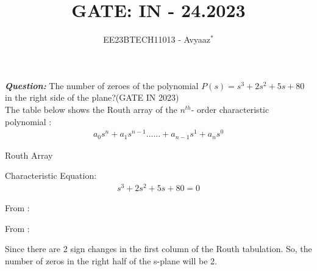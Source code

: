 \documentclass[journal,12pt,twocolumn]{IEEEtran}
\theoremstyle{remark}
\begin{document}

\vspace{3cm}

\title{GATE: IN - 24.2023}
\author{EE23BTECH11013 - Avyaaz$^{*}$%
}
\maketitle
\newpage
\bigskip

\renewcommand{\thefigure}{\arabic{figure}}
\renewcommand{\thetable}{\arabic{table}}

\large\textbf{\textsl{Question:}}
The number of zeroes of the polynomial $P(s) = s^3+2s^2+5s+80$ in the right side of the plane?\hfill(GATE IN 2023) \\
\solution
\fi
The table below shows the Routh array of the $n^{th}$- order characteristic polynomial : 
\begin{align}
    a_0s^n+a_1s^{n-1}......+a_{n-1}s^1+a_ns^0
\end{align}

\begin{table}[htbp]
\setlength{\extrarowheight}{8pt}
\centering

\caption{Routh Array}
\label{tab:routharray.IN.24.2023}
\end{table}
 Characteristic Equation:
\begin{align}
   s^3+2s^2+5s+80 = 0  
\end{align}


\noindent From :

\begin{table}[htbp]
\setlength{\extrarowheight}{10pt}
\centering

\caption{}
\label{tab:inputs.IN.24.2023}
\end{table}


\noindent From :

Since there are 2 sign changes in the first column of the Routh tabulation. So, the number of zeros in the right
half of the s-plane will be 2.

\end{document}
